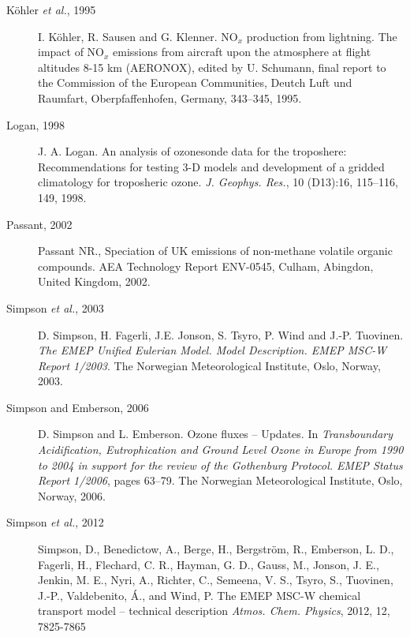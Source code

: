 \begin{description}
\item[K{\"o}hler {\sl et al.}, 1995] I. K{\"o}hler, R. Sausen and
  G. Klenner. 
NO$_x$ production from lightning. The impact of NO$_x$ emissions from
aircraft upon the atmosphere at flight altitudes 8-15 km (AERONOX),
edited by U. Schumann, final report to the Commission of the European
Communities, Deutch Luft und Raumfart, Oberpfaffenhofen, Germany,
343--345, 1995.


\item[Logan, 1998] J. A. Logan. An analysis of ozonesonde data for the
  troposhere: Recommendations for testing 3-D models and development
  of a gridded climatology for troposheric ozone. {\it
    J. Geophys. Res.}, 10 (D13):16, 115--116, 149, 1998.

\item[Passant, 2002] Passant NR., Speciation of UK emissions of non-methane 
volatile organic compounds. AEA Technology Report ENV-0545, Culham, Abingdon,
United Kingdom, 2002.

\item[Simpson {\sl et al.}, 2003] D. Simpson, H. Fagerli, J.E. Jonson, 
                    S. Tsyro, P. Wind and J.-P. Tuovinen.
{\it The EMEP Unified Eulerian Model. Model Description. EMEP MSC-W Report
1/2003}. The Norwegian
Meteorological Institute, Oslo, Norway, 2003.


\item[Simpson and Emberson, 2006] D. Simpson and L. Emberson. Ozone
  fluxes -- Updates.  
 In {\it Transboundary Acidification,
  Eutrophication  and Ground Level Ozone in Europe from 1990 to 2004
  in support for the review of the Gothenburg Protocol. EMEP Status
                   Report 1/2006}, pages 63--79. The Norwegian
Meteorological Institute, Oslo, Norway, 2006. 

%
\item[Simpson {\sl et al.}, 2012]
Simpson, D., Benedictow, A., Berge, H., Bergstr{\"o}m, R., Emberson, L. D., Fagerli, H., Flechard, C. R., Hayman, G. D., Gauss, M., Jonson, J. E., Jenkin, M. E., Nyri, A., Richter, C., Semeena, V. S., Tsyro, S., Tuovinen, J.-P., Valdebenito, \'A., and Wind, P. The EMEP MSC-W chemical transport model -- technical description {\it Atmos. Chem. Physics}, 2012, 12, 7825-7865


\end{description}
